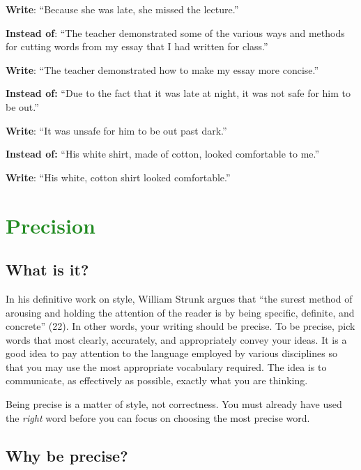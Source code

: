 \documentclass[12pt, hidelinks]{article} %
\begin{document}
\begin{enumerate}
    	\textbf{Write}: ``Because she was late, she missed the lecture.''
 
    	\textbf{Instead of}:  	``The teacher demonstrated some of the various ways and methods
                               	for cutting words from my essay that I had written for class.''
 
    	\textbf{Write}:           	``The teacher demonstrated how to make my essay more concise.''
 
    	\textbf{Instead of:}  	``Due to the fact that it was late at night, it was not safe for him to
                                	be out.''
 
    	\textbf{Write}:                    	``It was unsafe for him to be out past dark.''
 
 
    	\textbf{Instead of:}  	``His white shirt, made of cotton, looked comfortable to me.''
 
    	\textbf{Write}:        	          	``His white, cotton shirt looked comfortable.''

\end{enumerate}

\section{\textcolor{ForestGreen}{Precision}}
 
\subsection{What is it?}
 
In his definitive work on style, William Strunk argues that ``the surest method of arousing and holding the attention of the reader is by being specific, definite, and concrete'' (22). In other words, your writing should be precise. To be precise, pick words that most clearly, accurately, and appropriately convey your ideas.  It is a good idea to pay attention to the language employed by various disciplines so that you may use the most appropriate vocabulary required. The idea is to communicate, as effectively as possible, exactly what you are thinking.
 
Being precise is a matter of style, not correctness. You must already have used the \emph{right} word before you can focus on choosing the most precise word.
 
\subsection{Why be precise?}
 
\end{document}
